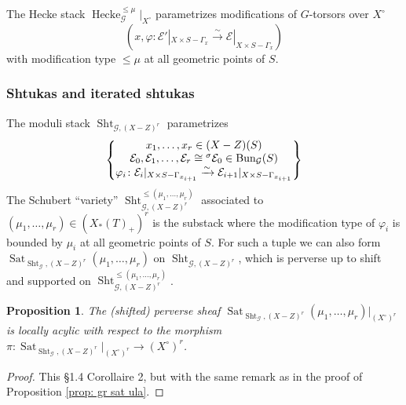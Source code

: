 \documentclass[reqno]{amsart}
\numberwithin{equation}{section}
\newcommand{\Cal}[1]{\mathcal{#1}}
\newcommand{\co}{\colon}
\newcommand{\cX}{X^{\circ}}
\DeclareMathOperator{\Bun}{Bun}
\DeclareMathOperator{\Sht}{Sht}
\DeclareMathOperator{\Hecke}{Hecke}
\DeclareMathOperator{\Sat}{Sat}
\newtheorem{prop}[thm]{Proposition}
\theoremstyle{remark}
\numberwithin{equation}{section}
\begin{document}
The Hecke stack $\Hecke_{\Cal{G}}^{\leq \mu}|_{\cX}$ parametrizes modifications of $G$-torsors over $\cX$
\[
(x, \varphi \colon \Cal{E}'|_{X \times S - \Gamma_{x}} \xrightarrow{\sim} \Cal{E}|_{X \times S - \Gamma_{x}})
 \]
 with modification type $\leq \mu$ at all geometric points of $S$. 
 
 
\subsubsection{Shtukas and iterated shtukas}

The moduli stack $\Sht_{\Cal{G},(X-Z)^r}$ parametrizes 
\[
 \left\{   \begin{array}{@{}c@{}} 
x_1,\ldots,x_r \in (X-Z)(S)  \\
\Cal{E}_0, \Cal{E}_1, \ldots, \Cal{E}_r \cong {}^{\sigma} \Cal{E}_0  \in \Bun_{\Cal{G}}(S)  \\
\varphi_i \colon \Cal{E}_i|_{X \times S - \Gamma_{x_{i+1}}} \xrightarrow{\sim} \Cal{E}_{i+1}|_{X \times S - \Gamma_{x_{i+1}}}
 \end{array} \right\}
\]
The Schubert ``variety'' $\Sht_{\Cal{G},(X-Z)^r}^{\leq  (\mu_1, \ldots, \mu_r) }$ associated to $ (\mu_1, \ldots, \mu_r) \in (X_*(T)_+)^r$  is the substack where the modification type of $\varphi_i$ is bounded by $\mu_i$ at all geometric points of $S$. For such a tuple we can also form $\Sat_{\Sht_{\Cal{G}},(X-Z)^r}(\mu_1, \ldots, \mu_r)$ on $\Sht_{\Cal{G},(X-Z)^r}$, which is perverse up to shift and supported on $\Sht_{\Cal{G},(X-Z)^r}^{\leq  (\mu_1, \ldots, \mu_r) }$. 


\begin{prop}\label{prop: sht sat ula}
The (shifted) perverse sheaf $\Sat_{\Sht_{\Cal{G}},(X-Z)^r}(\mu_1, \ldots, \mu_r)|_{(\cX)^r}$ is locally acylic with respect to the morphism  $\pi \co \Sat_{\Sht_{\Cal{G}},(X-Z)^r}|_{(\cX)^r} \rightarrow (\cX)^r$.
\end{prop} 

\begin{proof}
This \cite{Ngo06} \S 1.4 Corollaire 2, but with the same remark as in the proof of Proposition \ref{prop: gr sat ula}.
\end{proof}
\end{document}
